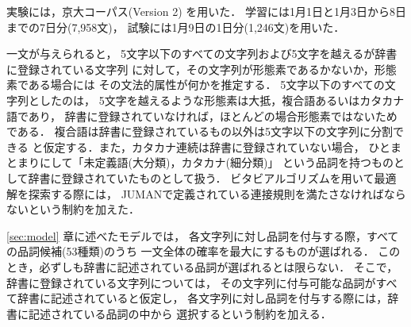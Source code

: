 実験には，京大コーパス(Version 2)
\cite{kurohashi:nlp97} を用いた．
学習には1月1日と1月3日から8日までの7日分(7,958文)，
試験には1月9日の1日分(1,246文)を用いた．

一文が与えられると，
5文字以下のすべての文字列および5文字を越えるが辞書に登録されている文字列
に対して，その文字列が形態素であるかないか，形態素である場合には
その文法的属性が何かを推定する．
5文字以下のすべての文字列としたのは，
5文字を越えるような形態素は大抵，複合語あるいはカタカナ語であり，
辞書に登録されていなければ，ほとんどの場合形態素ではないためである．
複合語は辞書に登録されているもの以外は5文字以下の文字列に分割できる
と仮定する．また，カタカナ連続は辞書に登録されていない場合，
ひとまとまりにして「未定義語(大分類)，カタカナ(細分類)」
という品詞を持つものとして辞書に登録されていたものとして扱う．
ビタビアルゴリズムを用いて最適解を探索する際には，
JUMANで定義されている連接規則を満たさなければならないという制約を加えた．

\ref{sec:model} 章に述べたモデルでは，
各文字列に対し品詞を付与する際，すべての品詞候補(53種類)のうち
一文全体の確率を最大にするものが選ばれる．
このとき，必ずしも辞書に記述されている品詞が選ばれるとは限らない．
そこで，辞書に登録されている文字列については，
その文字列に付与可能な品詞がすべて辞書に記述されていると仮定し，
各文字列に対し品詞を付与する際には，辞書に記述されている品詞の中から
選択するという制約を加える．


